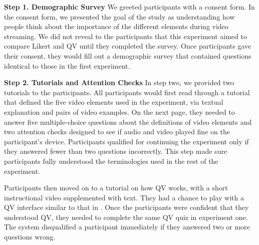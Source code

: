 \textbf{Step 1. Demographic Survey} We greeted participants with a consent form. In the consent form, we presented the goal of the study as understanding how people think about the importance of the different elements during video streaming. We did not reveal to the participants that this experiment aimed to compare Likert and QV until they completed the survey. Once participants gave their consent, they would fill out a demographic survey that contained questions identical to those in the first experiment.

\textbf{Step 2. Tutorials and Attention Checks} In step two, we provided two tutorials to the participants. All participants would first read through a tutorial that defined the five video elements used in the experiment, via textual explanation and pairs of video examples. On the next page, they needed to answer five multiple-choice questions about the definitions of video elements and two attention checks designed to see if audio and video played fine on the participant's device. Participants qualified for continuing the experiment only if they answered fewer than two questions incorrectly. This step made sure participants fully understood the terminologies used in the rest of the experiment.

Participants then moved on to a tutorial on how QV works, with a short instructional video supplemented with text. They had a chance to play with a QV interface similar to that in . Once the participants were confident that they understood QV, they needed to complete the same QV quiz in experiment one. The system disqualified a participant immediately if they answered two or more questions wrong.

